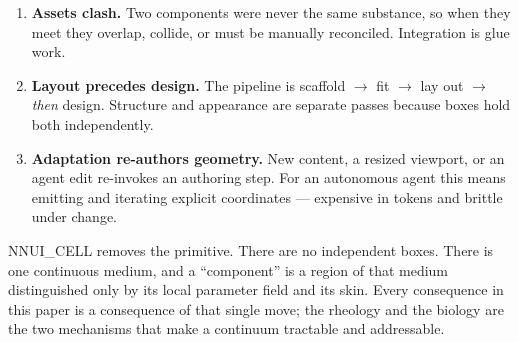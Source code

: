 \documentclass[11pt]{article}
\begin{document}
\begin{enumerate}[leftmargin=1.4em]
  \item \textbf{Assets clash.} Two components were never the same substance, so when they meet
  they overlap, collide, or must be manually reconciled. Integration is glue work.
  \item \textbf{Layout precedes design.} The pipeline is scaffold $\rightarrow$ fit $\rightarrow$
  lay out $\rightarrow$ \emph{then} design. Structure and appearance are separate passes because
  boxes hold both independently.
  \item \textbf{Adaptation re-authors geometry.} New content, a resized viewport, or an
  agent edit re-invokes an authoring step. For an autonomous agent this means emitting and
  iterating explicit coordinates --- expensive in tokens and brittle under change.
\end{enumerate}

NNUI\_CELL removes the primitive. There are no independent boxes. There is one continuous
medium, and a ``component'' is a region of that medium distinguished only by its local
parameter field and its skin. Every consequence in this paper is a consequence of that single
move; the rheology and the biology are the two mechanisms that make a continuum tractable and
addressable.
\end{document}
